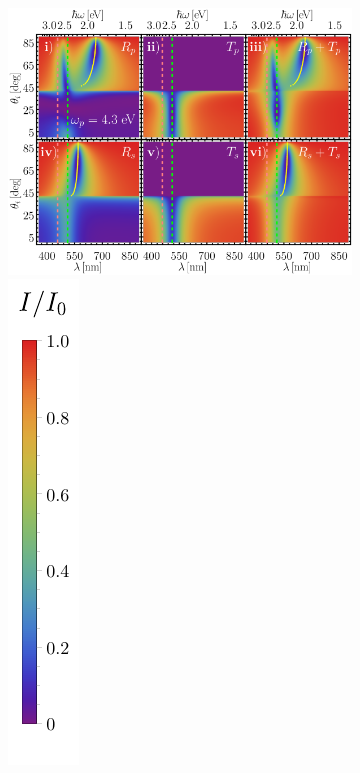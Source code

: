 \begin{figure}[h!]\centering
	\begin{subfigure}{.01\linewidth}\caption{}\label{sfig:RT-4}\vspace{6.5cm}\end{subfigure}
	\begin{subfigure}{.7\linewidth}\hspace*{-.5em}
	\includegraphics[scale=.65]{2-Resultados/figs/5-RT-Wp4-10/0-2D_Grid_1.png}%
	\includegraphics[scale=1, trim={00 -5 00 00}, clip]{2-Resultados/figs/0-IBar_v}

\end{subfigure}
\end{figure}

